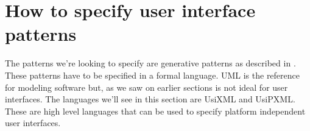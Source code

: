 \section{How to specify user interface patterns}
\label{section:How_to_specify_user_interface_patterns}
The patterns we're looking to specify are generative patterns as described in \cite{Generative_pattern-based_design_of_user_interfaces}. These patterns have to be specified in a formal language. UML is the reference for modeling software but, as we saw on earlier sections is not ideal for user interfaces.
The languages we'll see in this section are UsiXML and UsiPXML. These are high level languages that can be used to specify platform independent user interfaces.



